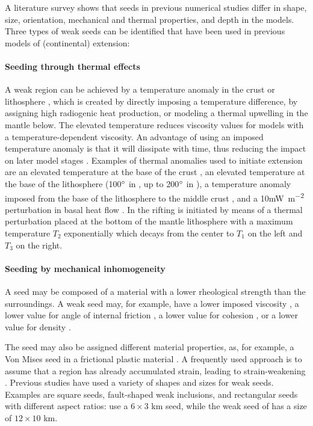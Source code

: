 A literature survey shows that seeds in previous numerical studies differ in shape, size, 
orientation, mechanical and thermal properties, and depth in the models. 
Three types of weak seeds can be identified that have been 
used in previous models of (continental) extension:

\paragraph{Seeding through thermal effects}
A weak region can be achieved by a temperature anomaly in the crust or lithosphere \cite{bupo99},
which is created by directly imposing a temperature difference, by assigning high radiogenic 
heat production, or modeling a thermal upwelling in the mantle below.
The elevated temperature reduces viscosity values for models with a temperature-dependent 
viscosity.
An advantage of using an imposed temperature anomaly is that it will dissipate with time, 
thus reducing the impact on later model stages \cite{hani03}.
Examples of thermal anomalies used to initiate extension are
an elevated temperature at the base of the crust \cite{hani03},
an elevated temperature at the base of the lithosphere 
(100$\rm^\circ$ in \cite{bupo01}, 
up to 200$\rm^\circ$ in \cite{brau13}),
a temperature anomaly imposed from the base of the lithosphere to the middle
crust \cite{chld92},
and a 10\si{\milli\watt\per\square\metre} perturbation in basal heat flow \cite{frbr01}.
In \cite{bupo01} the rifting is initiated by means of 
a thermal perturbation placed at the bottom of the mantle lithosphere with a maximum temperature $T_{2}$ 
exponentially which decays from the center to $T_{1}$ on the left and $T_{3}$ on the right. 

\paragraph{Seeding by mechanical inhomogeneity} 
A seed may be composed of a material with a lower rheological strength than the 
surroundings.
A weak seed may, for example, have a lower imposed viscosity 
\cite{lemm08,kaus10,mishin11}, 
a lower value for angle of internal friction 
\cite{pybf02,kapo06,thie11,grpy13,chbe13}, 
a lower value for cohesion \cite{alht11}, or a lower value for density \cite{tibb08}. 

The seed may also be assigned different material properties, as, for example,
a Von Mises seed in a frictional plastic material \cite{hube07}.
A frequently used approach is to assume that a region has already accumulated
strain, leading to strain-weakening 
\cite{labp00,hubb05,peso08,alht11,alht12,knak13,alhf13}. 
Previous studies have used a variety of shapes and sizes for weak seeds. 
Examples are square seeds, fault-shaped weak inclusions, and rectangular seeds with different 
aspect ratios: \cite{hubb05} use a $6\times 3$ km seed, while the weak seed 
of \cite{hube07} has a size of $12\times 10$ km. 

